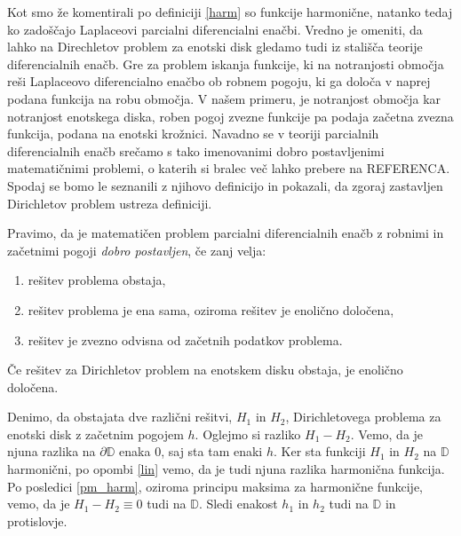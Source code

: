 \documentclass[mat1]{fmfdelo}
\begin{document}
    Kot smo že komentirali po definiciji \ref{harm} so funkcije harmonične, natanko tedaj ko zadoščajo Laplaceovi parcialni diferencialni enačbi.   
    Vredno je omeniti, da lahko na Direchletov problem za enotski disk gledamo tudi iz stališča teorije diferencialnih enačb. Gre za problem iskanja funkcije, ki na notranjosti območja reši Laplaceovo diferencialno enačbo ob robnem pogoju, ki ga določa v naprej podana funkcija na robu območja.     
    V našem primeru, je notranjost območja kar notranjost enotskega diska, roben pogoj zvezne funkcije pa podaja začetna zvezna funkcija, podana na enotski krožnici.
    Navadno se v teoriji parcialnih diferencialnih enačb srečamo s tako imenovanimi dobro postavljenimi matematičnimi problemi, o katerih si bralec več lahko prebere na REFERENCA.     
    Spodaj se bomo le seznanili z njihovo definicijo in pokazali, da zgoraj zastavljen Dirichletov problem ustreza definiciji. 

    \begin{definicija}[J. Hadamard 1902]
        \label{def_dp}
        Pravimo, da je matematičen problem parcialni diferencialnih enačb z robnimi in začetnimi pogoji \emph{dobro postavljen}, če zanj velja:
        \begin{enumerate}[label={\Alph*)}]
            \item rešitev problema obstaja,
            \item rešitev problema je ena sama, oziroma rešitev je enolično določena,
            \item rešitev je zvezno odvisna od začetnih podatkov problema.
        \end{enumerate}
    \end{definicija}

    \begin{lema}
        \label{enolicno}
        Če rešitev za Dirichletov problem na enotskem disku obstaja, je enolično določena.
    \end{lema}
    \begin{dokaz}
        Denimo, da obstajata dve različni rešitvi, $H_1$ in $H_2$, Dirichletovega problema za enotski disk z začetnim pogojem $h$.
        Oglejmo si razliko $H_1 - H_2$. Vemo, da je njuna razlika na $\partial \mathbb{D}$ enaka $0$, saj sta tam enaki $h$. Ker sta funkciji $H_1$ in $H_2$ na $\mathbb{D}$ harmonični, po opombi \ref{lin} vemo, da je tudi njuna razlika harmonična funkcija. 
        Po posledici \ref{pm_harm}, oziroma principu maksima za harmonične funkcije, vemo, da je $H_1 - H_2 \equiv 0$ tudi na $\mathbb{D}$. Sledi enakost $h_1$ in $h_2$ tudi na $\mathbb{D}$ in protislovje. 
    \end{dokaz}
    
\end{document}
